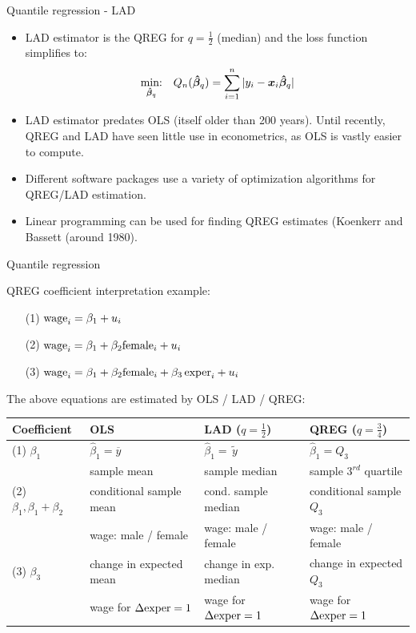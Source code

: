 \documentclass{beamer}
\begin{document}
\begin{frame}{Quantile regression - LAD}
\begin{itemize}
\item LAD estimator is the QREG for $q=\tfrac{1}{2}$ (median) and the loss function simplifies to: $$
\underset{\bm{\hat{\beta}}_{q}}{\textnormal{min:}} \quad Q_n(\bm{\hat{\beta}}_{q}) =
\sum_{i=1}^n |y_i-\bm{x}_i\bm{\hat{\beta}}_{q}|
$$
\item LAD estimator predates OLS (itself older than 200 years). Until recently, QREG and LAD have seen little use in econometrics, as OLS is vastly easier to compute.
\item Different software packages use a variety of optimization algorithms for QREG/LAD estimation.
\item Linear programming can be used for finding QREG estimates (Koenkerr and Bassett (around 1980).
\end{itemize}
\end{frame}
\begin{frame}{Quantile regression}

QREG coefficient interpretation example:\\
\bigskip
\begin{itemize}
    \item[(1)] $\textnormal{wage}_i = \beta_1 + u_i$
    \item[(2)] $\textnormal{wage}_i = \beta_1 + \beta_2 \textnormal{female}_i + u_i$
    \item[(3)] $\textnormal{wage}_i = \beta_1 + \beta_2 \textnormal{female}_i + \beta_3 \, \textnormal{exper}_i + u_i$
\end{itemize}
\bigskip
The above equations are estimated by OLS / LAD / QREG:\\
\bigskip
\tiny
\begin{tabular}{|l| l |l |l|}
 \hline
 Coefficient   &     OLS     &   LAD ($q=\tfrac{1}{2}$)   &  QREG ($q=\tfrac{3}{4}$)\\
 \hline 
 (1) $\beta_1$ &   $\hat{\beta}_1=\overline{y}$ & $\hat{\beta}_1=\tilde{\,y\,}$ & $\hat{\beta}_1=Q_3$\\
 & sample mean  & sample median & sample $3^{rd}$ quartile\\
 \hline
 (2) $\beta_1, \beta_1\!+\!\beta_2$ & conditional sample mean & cond. sample median & conditional sample $Q_3$\\
  & wage: male / female & wage: male / female & wage: male / female \\
  \hline
  (3) $\beta_3$ & change in expected mean & change in exp. median & change in expected $Q_3$\\
   & wage for $\Delta\textnormal{exper}=1$ & wage for $\Delta\textnormal{exper}=1$ & wage for $\Delta\textnormal{exper}=1$\\
   \hline
\end{tabular}
\end{frame}
\end{document}
